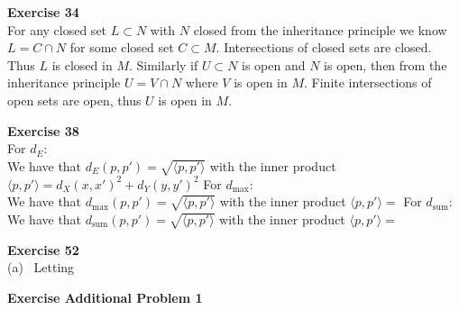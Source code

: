 \documentclass[12pt]{article}
\newenvironment{ques}[1]{\textbf{Exercise #1}\vspace{1 mm}\\ }{\bigskip}
\theoremstyle{definition}
\begin{document}
\begin{ques}{34}
	For any closed set $L \subset N$ with $N$ closed from the inheritance
	principle we know $L = C \cap N$ for some closed set $C \subset M$.
	Intersections of closed sets are closed. Thus $L$ is closed in $M$.
	Similarly if $U \subset N$ is open and $N$ is open,  then from the
	inheritance principle $U = V \cap N$ where $V$ is open in $M$. Finite
	intersections of open sets are open, thus $U$ is open in $M$.
\end{ques}

\begin{ques}{38}
	For $d_E$:  \\
	We have that $d_E(p,p') = \sqrt{\langle p, p' \rangle}$ with the inner
	product $\langle p , p'\rangle = d_X(x,x')^2 + d_Y(y,y')^2$ 
	For $d_\text{max}$:\\
	We have that $d_\text{max}(p,p') = \sqrt{\langle p, p' \rangle}$ with the inner
	product $\langle p , p'\rangle = $ 
	For $d_\text{sum}$:\\
	We have that $d_\text{sum}(p,p') = \sqrt{\langle p, p' \rangle}$ with the inner
	product $\langle p , p'\rangle = $ 

\end{ques}

\begin{ques}{52}
	(a) \ Letting 
\end{ques}

\begin{ques}{Additional Problem 1}
	
\end{ques}
\end{document}
